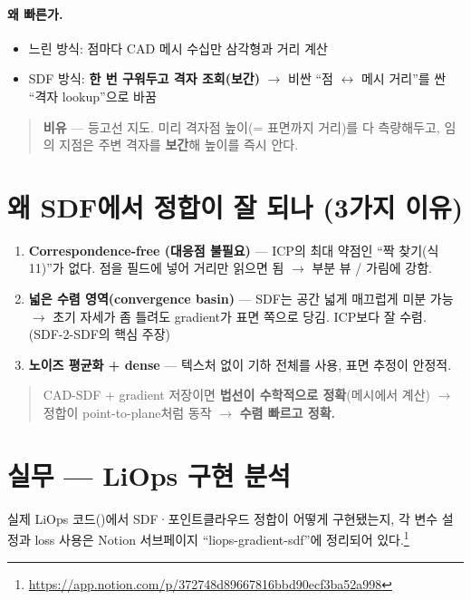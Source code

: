 \paragraph{왜 빠른가.}
\begin{itemize}
  \item 느린 방식: 점마다 CAD 메시 수십만 삼각형과 거리 계산
  \item SDF 방식: \textbf{한 번 구워두고 격자 조회(보간)} $\to$ 비싼 ``점
  $\leftrightarrow$ 메시 거리''를 싼 ``격자 lookup''으로 바꿈
\end{itemize}

\begin{quote}
  \small\textbf{비유} --- 등고선 지도. 미리 격자점 높이(= 표면까지 거리)를 다
  측량해두고, 임의 지점은 주변 격자를 \textbf{보간}해 높이를 즉시 안다.
\end{quote}

\section{왜 SDF에서 정합이 잘 되나 (3가지 이유)}

\begin{enumerate}
  \item \textbf{Correspondence-free (대응점 불필요)} --- ICP의 최대 약점인
  ``짝 찾기(식 11)''가 없다. 점을 필드에 넣어 거리만 읽으면 됨 $\to$ 부분 뷰 /
  가림에 강함.
  \item \textbf{넓은 수렴 영역(convergence basin)} --- SDF는 공간 넓게
  매끄럽게 미분 가능 $\to$ 초기 자세가 좀 틀려도 gradient가 표면 쪽으로 당김.
  ICP보다 잘 수렴. (SDF-2-SDF의 핵심 주장)
  \item \textbf{노이즈 평균화 + dense} --- 텍스처 없이 기하 전체를 사용, 표면
  추정이 안정적.
\end{enumerate}

\begin{quote}
  \small CAD-SDF + gradient 저장이면 \textbf{법선이 수학적으로 정확}(메시에서
  계산) $\to$ 정합이 point-to-plane처럼 동작 $\to$ \textbf{수렴 빠르고 정확.}
\end{quote}

\section{실무 --- LiOps 구현 분석}

실제 LiOps 코드()에서 SDF·포인트클라우드 정합이
어떻게 구현됐는지, 각 변수 설정과 loss 사용은 Notion 서브페이지
``liops-gradient-sdf''에 정리되어 있다.\footnote{%
  \url{https://app.notion.com/p/372748d89667816bbd90ecf3ba52a998}}


